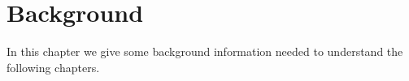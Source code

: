 \chapter{Background}
\label{ch:background}

In this chapter we give some background information needed to understand the following chapters.
